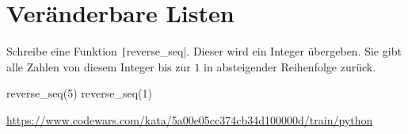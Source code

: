 \documentclass[class=scrartcl, crop=false]{standalone}
\begin{document}
\section{Veränderbare Listen}


\begin{aufgabe}
Schreibe eine Funktion \texttt|reverse_seq|. Dieser wird ein Integer übergeben. Sie gibt alle Zahlen von diesem Integer bis zur $1$ in absteigender Reihenfolge zurück.

\begin{pyconsole}
reverse_seq(5)
reverse_seq(1)
\end{pyconsole}

\url{https://www.codewars.com/kata/5a00e05cc374cb34d100000d/train/python}

\end{aufgabe}
\end{document}
